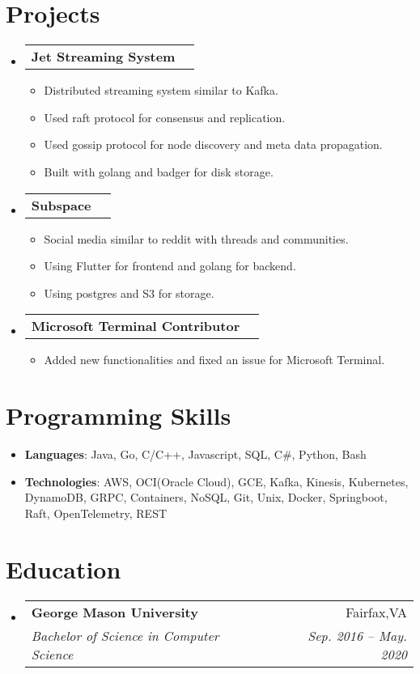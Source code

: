 \documentclass[letterpaper,11pt]{article}
\makeatletter
\newcommand{\resumeItem}[1]{
  \item\small{
    #1
  }
}
\newcommand{\resumeSubheading}[4]{
  \vspace{-1pt}\item
    \begin{tabular*}{0.97\textwidth}[t]{l@{\extracolsep{\fill}}r}
      \textbf{#1} & #2 \\
      \textit{\small#3} & \textit{\small #4} \\
    \end{tabular*}\vspace{-5pt}
}
\newcommand{\projectSubheading}[1]{
  \vspace{-1pt}\item
    \begin{tabular*}{0.97\textwidth}[t]{l@{\extracolsep{\fill}}r}
      \textbf{#1}
    \end{tabular*}\vspace{-5pt}
}
\newcommand{\resumeSubHeadingListStart}{\begin{itemize}[leftmargin=*]}
\newcommand{\resumeSubHeadingListEnd}{\end{itemize}}
\newcommand{\resumeItemListStart}{\begin{itemize}}
\newcommand{\resumeItemListEnd}{\end{itemize}\vspace{-5pt}}
\makeatother
\begin{document}
\section{Projects}
 \resumeSubHeadingListStart
    \projectSubheading {Jet Streaming System}
        \resumeItemListStart
          \resumeItem
            {Distributed streaming system similar to Kafka.}
          \resumeItem
            {Used raft protocol for consensus and replication.}
          \resumeItem
            {Used gossip protocol for node discovery and meta data propagation.}
          \resumeItem
            {Built with golang and badger for disk storage.}
      \resumeItemListEnd
    \projectSubheading {Subspace}
      \resumeItemListStart
        \resumeItem
          {Social media similar to reddit with threads and communities.}
        \resumeItem
          {Using Flutter for frontend and golang for backend.}
        \resumeItem
          {Using postgres and S3 for storage.}
    \resumeItemListEnd
    \projectSubheading {Microsoft Terminal Contributor}
      \resumeItemListStart
        \resumeItem
          {Added new functionalities and fixed an issue for Microsoft Terminal.}
    \resumeItemListEnd
  \resumeSubHeadingListEnd

\section{Programming Skills}
 \resumeSubHeadingListStart
   \item{
     \textbf{Languages}{: Java, Go, C/C++, Javascript, SQL, C\#, Python, Bash }
   }
   \item{     
    \textbf{Technologies}{: AWS, OCI(Oracle Cloud), GCE, Kafka, Kinesis, Kubernetes, DynamoDB, GRPC,
     Containers, NoSQL, Git, Unix, Docker, Springboot, Raft, OpenTelemetry, REST}
   }  
 \resumeSubHeadingListEnd
   
\section{Education}
  \resumeSubHeadingListStart
    \resumeSubheading
      {George Mason University}{Fairfax,VA}
      {Bachelor of Science in Computer Science}{Sep. 2016 -- May. 2020}
  \resumeSubHeadingListEnd
\end{document}
